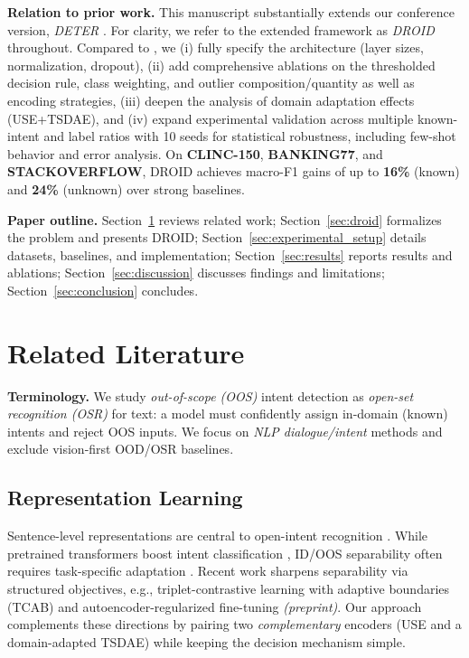 \documentclass[journal,letterpaper]{IEEEtran}
\newcommand{\method}{\textsc{DROID}}
\newcommand{\thresholdrule}{thresholded decision rule}
\begin{document}
\noindent\textbf{Relation to prior work.}
This manuscript substantially extends our conference version, \emph{DETER} \cite{zawbaa2024deter}. For clarity, we refer to the extended framework as \emph{DROID} throughout. Compared to \cite{zawbaa2024deter}, we (i) fully specify the architecture (layer sizes, normalization, dropout), (ii) add comprehensive ablations on the \thresholdrule, class weighting, and outlier composition/quantity as well as encoding strategies, (iii) deepen the analysis of domain adaptation effects (USE+TSDAE), and (iv) expand experimental validation across multiple known-intent and label ratios with 10 seeds for statistical robustness, including few-shot behavior and error analysis. On \textbf{CLINC-150}, \textbf{BANKING77}, and \textbf{STACKOVERFLOW}, DROID achieves macro-F1 gains of up to \textbf{16\%} (known) and \textbf{24\%} (unknown) over strong baselines.

\noindent\textbf{Paper outline.} Section~\ref{sec:related_literature} reviews related work; Section~\ref{sec:droid} formalizes the problem and presents \method; Section~\ref{sec:experimental_setup} details datasets, baselines, and implementation; Section~\ref{sec:results} reports results and ablations; Section~\ref{sec:discussion} discusses findings and limitations; Section~\ref{sec:conclusion} concludes.


\newcommand{\preprint}{\textit{(preprint)}}

\section{Related Literature}
\label{sec:related_literature}

\noindent\textbf{Terminology.}
We study \emph{out-of-scope (OOS)} intent detection as \emph{open-set recognition (OSR)} for text: a model must confidently assign in-domain (known) intents and reject OOS inputs. We focus on \emph{NLP dialogue/intent} methods and exclude vision-first OOD/OSR baselines.

\subsection{Representation Learning}
Sentence-level representations are central to open-intent recognition \cite{Nils_2019}. While pretrained transformers boost intent classification \cite{devlin-etal-2019-bert}, ID/OOS separability often requires task-specific adaptation \cite{Vibhav_2021}. Recent work sharpens separability via structured objectives, e.g., triplet-contrastive learning with adaptive boundaries (TCAB) \cite{chen2024tcab} and autoencoder-regularized fine-tuning \cite{zhang2024finetuning}\preprint{}. Our approach complements these directions by pairing two \emph{complementary} encoders (USE and a domain-adapted TSDAE) while keeping the decision mechanism simple.
\end{document}
